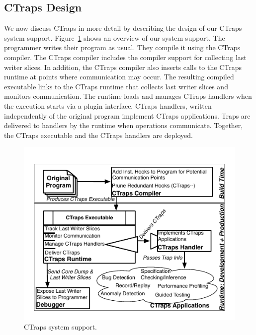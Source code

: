 \documentclass[preprint,9pt]{sigplanconf}
\newcommand{\ctraps}{CTraps\xspace}
\begin{document}
\subsection{\ctraps Design}

We now discuss \ctraps in more detail by describing the design of our \ctraps
system support.  Figure~\ref{fig:systemdiagram} shows an overview of our system
support.  The programmer writes their program as usual.  They compile it using
the \ctraps compiler. The \ctraps compiler includes the compiler support for
collecting last writer slices.  In addition, the \ctraps compiler also inserts
calls to the \ctraps runtime at points where communication may occur.  The
resulting compiled executable links to the \ctraps runtime that collects last
writer slices and monitors communication.  The runtime loads and manages \ctraps
handlers when the execution starts via a plugin interface.  \ctraps handlers,
written independently of the original program implement \ctraps applications.
Traps are delivered to handlers by the runtime when operations communicate.
Together, the \ctraps executable and the \ctraps handlers are deployed.


\begin{figure}[htb]
\centering
\includegraphics[width=.90\columnwidth]{figs/SystemDiagram.pdf}
\caption{\label{fig:systemdiagram}CTraps system support.}
\end{figure}


\end{document}
